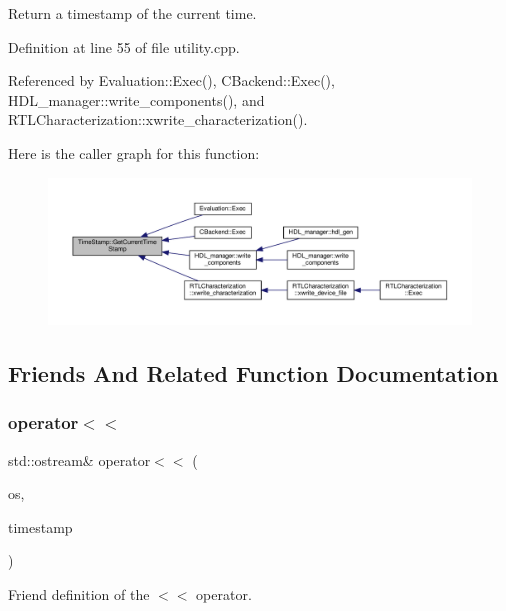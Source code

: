 Return a timestamp of the current time. 



Definition at line 55 of file utility.\+cpp.



Referenced by Evaluation\+::\+Exec(), C\+Backend\+::\+Exec(), H\+D\+L\+\_\+manager\+::write\+\_\+components(), and R\+T\+L\+Characterization\+::xwrite\+\_\+characterization().

Here is the caller graph for this function\+:
\nopagebreak
\begin{figure}[H]
\begin{center}
\leavevmode
\includegraphics[width=350pt]{dc/d45/structTimeStamp_af05020c48d0889c76d9717a88a6b75b9_icgraph}
\end{center}
\end{figure}


\subsection{Friends And Related Function Documentation}
\mbox{\label{structTimeStamp_aa1f9c4e19c39c0bd0df700360d40312d}} 
\subsubsection{\texorpdfstring{operator$<$$<$}{operator<<}}
{\footnotesize\ttfamily std\+::ostream\& operator$<$$<$ (\begin{DoxyParamCaption}\item[{std\+::ostream \&}]{os,  }\item[{const \hyperlink{structTimeStamp}{Time\+Stamp} \&}]{timestamp }\end{DoxyParamCaption})\hspace{0.3cm}{\ttfamily [friend]}}



Friend definition of the $<$$<$ operator. 


